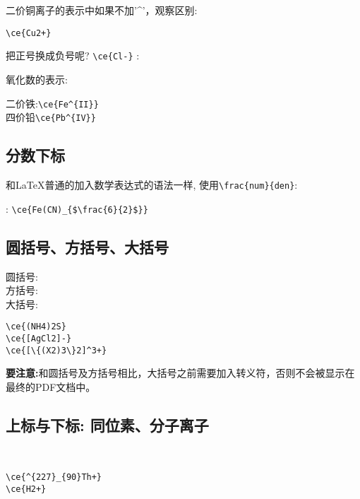 \documentclass[UTF8, a4paper]{article}
\begin{document}
\noindent 二价铜离子的表示中如果不加'\^{}'，观察区别:

\begin{minipage}{.3\textwidth}
\end{minipage}
\begin{minipage}{.7\textwidth}
	\verb|\ce{Cu2+}|
\end{minipage}

\noindent 把正号换成负号呢? \verb|\ce{Cl-}| : \newline

\noindent 氧化数的表示:

\noindent 二价铁:\qquad \verb|\ce{Fe^{II}}|\\ 
四价铅\qquad \verb|\ce{Pb^{IV}}|

\subsection{分数下标}
和\LaTeX 普通的加入数学表达式的语法一样, 使用\verb|\frac{num}{den}|: 

: \verb|\ce{Fe(CN)_{$\frac{6}{2}$}}|

\subsection{圆括号、方括号、大括号}
\begin{minipage}{.3\textwidth}
	圆括号:\\
	方括号:\ce{[AgCl2]-}\\
	大括号:
\end{minipage}
\begin{minipage}{.7\textwidth}
	\verb|\ce{(NH4)2S}|\\
	\verb|\ce{[AgCl2]-}|\\
	\verb|\ce{[\{(X2)3\}2]^3+}|
\end{minipage}

\textbf{要注意:}和圆括号及方括号相比，大括号之前需要加入转义符，否则不会被显示在最终的PDF文档中。
\subsection{上标与下标: 同位素、分子离子}
\begin{minipage}{.3\textwidth}
	\\
\end{minipage}
\begin{minipage}{.7\textwidth}
	\verb|\ce{^{227}_{90}Th+}|\\
	\verb|\ce{H2+}|
\end{minipage}
\end{document}
